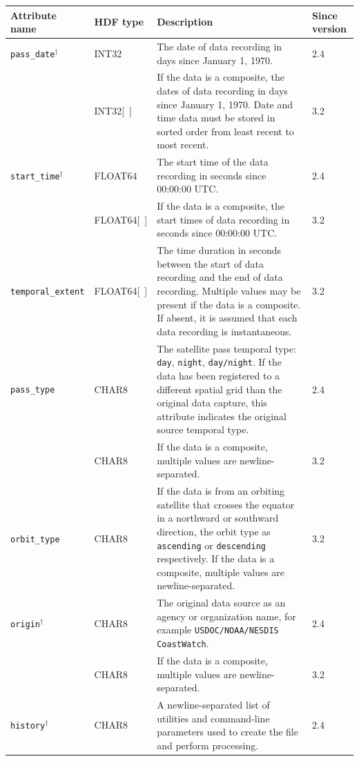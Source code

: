 \begin{tabular}{|l|l|p{7.5cm}|l|}

  \hline

  Attribute name & HDF type & Description & Since version \\ \hline

  {\tt pass\_date}$^{\dagger}$ & INT32 & The date of data recording in
  days since January 1, 1970. & 2.4 \\ \hline

  & INT32[~] & If the data is a composite, the dates of data recording
  in days since January 1, 1970. Date and time data must be stored in
  sorted order from least recent to most recent. & 3.2 \\ \hline

  {\tt start\_time}$^{\dagger}$ & FLOAT64 & The start time of the data
  recording in seconds since 00:00:00 UTC. & 2.4 \\ \hline

  & FLOAT64[~] & If the data is a composite, the start times of data
  recording in seconds since 00:00:00 UTC. & 3.2 \\ \hline

  {\tt temporal\_extent} & FLOAT64[~] & The time duration in seconds
  between the start of data recording and the end of data
  recording. Multiple values may be present if the data is a
  composite. If absent, it is assumed that each data recording is
  instantaneous.  & 3.2 \\ \hline

  {\tt pass\_type} & CHAR8 & The satellite pass temporal type: {\tt
  day}, {\tt night}, {\tt day/night}.  If the data has been registered
  to a different spatial grid than the original data capture, this attribute
  indicates the original source temporal type. & 2.4 \\ \hline
  
  & CHAR8 & If the data is a composite, multiple values are
  newline-separated. & 3.2 \\ \hline

  {\tt orbit\_type} & CHAR8 & If the data is from an orbiting
  satellite that crosses the equator in a northward or southward
  direction, the orbit type as {\tt ascending} or {\tt descending}
  respectively. If the data is a composite, multiple values are
  newline-separated. & 3.2 \\ \hline

  {\tt origin}$^{\dagger}$ & CHAR8 & The original data source as an
  agency or organization name, for example {\tt USDOC/NOAA/NESDIS
  CoastWatch}. & 2.4 \\ \hline

  & CHAR8 & If the data is a composite, multiple values are
  newline-separated. & 3.2 \\ \hline

  {\tt history}$^{\dagger}$ & CHAR8 & A newline-separated list of
  utilities and command-line parameters used to create the file and
  perform processing. & 2.4 \\ \hline

\end{tabular} \\
